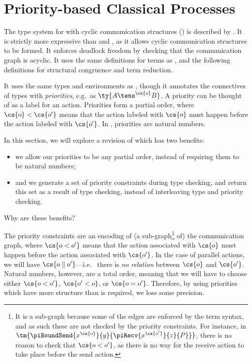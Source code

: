 \documentclass{article}
\begin{document}
\section{Priority-based Classical Processes}\label{sec:ccp}
The type system for \cp with cyclic communication structures (\ccp) is described
by \textcite{dardha2018}.
It is strictly more expressive than \cp and \hccp, as it allows cyclic
communication structures to be formed.
It enforces deadlock freedom by checking that the communication graph is
acyclic.
It uses the same definitions for terms as \hccp, and the following definitions
for structural congruence and term reduction. 


It uses the same types and environments as \hccp, though it annotates the
connectives of types with \emph{priorities}, e.g.\ as $\ty{A \tens^{\cs{o}} B}$.
A priority can be thought of as a label for an action.
Priorities form a partial order, where $\cs{o}<\cs{o'}$ means that the action
labeled with $\cs{o}$ must happen before the action labeled with $\cs{o'}$.
In \textcite{dardha2018}, priorities are natural numbers.



In this section, we will explore a revision of \ccp which has two benefits:
\begin{itemize}
\item
  we allow our priorities to be any partial order, instead of requiring them to
  be natural numbers;
\item
  and we generate a set of priority constraints during type checking, and return 
  this set as a result of type checking, instead of interleaving type and
  priority checking.
\end{itemize}
Why are these benefits?

The priority constraints are an encoding of (a sub-graph\footnote{%
  It is a sub-graph because some of the edges are enforced by the term syntax,
  and as such these are not checked by the priority constraints.
  For instance, in
  $\tm{\piBoundSend{x^{\cs{o}}}{y}{\piRecv{x^{\cs{o'}}}{z}{P}}}$,
  there is no reason to check that $\cs{o < o'}$, as there is no way for the
  receive action to take place before the send action.
} of) the communication graph, where $\cs{o < o'}$ means that the action
associated with $\cs{o}$ must happen before the action associated with
$\cs{o'}$.
In the case of parallel actions, we will have $\cs{o \parallel o'}$---i.e.\ %
there is \emph{no relation} between $\cs{o}$ and $\cs{o'}$. 
Natural numbers, however, are a total order, meaning that we will have to choose
either $\cs{o < o'}$, $\cs{o' < o}$, or $\cs{o = o'}$.
Therefore, by using priorities which have more structure than is required, we
lose some precision.
\end{document}
